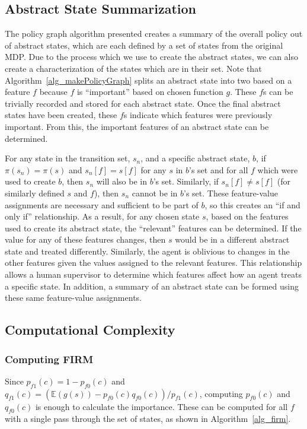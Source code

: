 \documentclass[letterpaper]{article} %
\begin{document}
\subsection{Abstract State Summarization} \label{approach_abstractStateSummarization}
The policy graph algorithm presented creates a summary of the overall policy out of abstract states, which are each defined by a set of states from the original MDP. Due to the process which we use to create the abstract states, we can also create a characterization of the states which are in their set. Note that Algorithm~\ref{alg_makePolicyGraph} splits an abstract state into two based on a feature $f$ because $f$ is ``important'' based on chosen function $g$. These $f$s can be trivially recorded and stored for each abstract state. Once the final abstract states have been created, these $f$s indicate which features were previously important. From this, the important features of an abstract state can be determined. 

For any state in the transition set, $s_n$, and a specific abstract state, $b$, if $\pi(s_n) = \pi(s)$ and $s_n[f] = s[f]$ for any $s$ in $b$'s set and for all $f$ which were used to create $b$, then $s_n$ will also be in $b$'s set. Similarly, if $s_n[f] \neq s[f]$ (for similarly defined $s$ and $f$), then $s_n$ cannot be in $b$'s set. These feature-value assignments are necessary and sufficient to be part of $b$, so this creates an ``if and only if'' relationship. As a result, for any chosen state $s$, based on the features used to create its abstract state, the ``relevant'' features can be determined. 
If the value for any of these features changes, then $s$ would be in a different abstract state and treated differently. Similarly, the agent is oblivious to changes in the other features given the values assigned to the relevant features. This relationship allows a human supervisor to determine which features affect how an agent treats a specific state. In addition, a summary of an abstract state can be formed using these same feature-value assignments. 

\subsection{Computational Complexity} 
\label{approach_computationalComplexity}

\subsubsection{Computing FIRM}
Since $p_{f1}(c) = 1 - p_{f0}(c)$ and $q_{f1}(c) = (\mathbb{E}(g(s)) - p_{f0}(c) q_{f0}(c)) / p_{f1}(c)$, computing $p_{f0}(c)$ and $q_{f0}(c)$ is enough to calculate the importance. These can be computed for all $f$ with a single pass through the set of states, as shown in Algorithm~\ref{alg_firm}.
\end{document}
